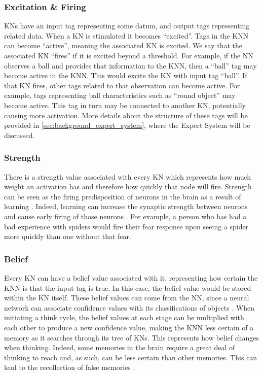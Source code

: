\documentclass[titlepage,11pt]{article}
\begin{document}
\subsubsection{Excitation \& Firing}
KNs have an input tag representing some datum, and output tags representing related data. When a KN is stimulated it becomes ``excited''. Tags in the KNN can become ``active'', meaning the associated KN is excited. We say that the associated KN ``fires'' if it is excited beyond a threshold. For example, if the NN observes a ball and provides that information to the KNN, then a ``ball'' tag may become active in the KNN. This would excite the KN with input tag ``ball''. If that KN fires, other tags related to that observation can become active. For example, tags representing ball characteristics such as ``round object'' may become active. This tag in turn may be connected to another KN, potentially causing more activation. More details about the structure of these tags will be provided in \cref{sec:background_expert_system}, where the Expert System will be discussed.

\subsubsection{Strength}
There is a strength value associated with every KN which represents how much weight an activation has and therefore how quickly that node will fire. Strength can be seen as the firing predisposition of neurons in the brain as a result of learning \cite{vybihal-knowledge}. Indeed, learning can increase the synaptic strength between neurons and cause early  firing of those neurons \cite{hebb}. For example, a person who has had a bad experience with spiders would fire their fear response upon seeing a spider more quickly than one without that fear.

\subsubsection{Belief}
Every KN can have a belief value associated with it, representing how certain the KNN is that the input tag is true. In this case, the belief value would be stored within the KN itself. These belief values can come from the NN, since a neural network can associate confidence values with its classifications of objects \cite{mitchell1997machine}. When initiating a think cycle, the belief values at each stage can be multiplied with each other to produce a new confidence value, making the KNN less certain of a memory as it searches through its tree of KNs. This represents how belief changes when thinking. Indeed, some memories in the brain require a great deal of thinking to reach and, as such, can be less certain than other memories. This can lead to the recollection of false memories \cite{falsememories}.
\end{document}
